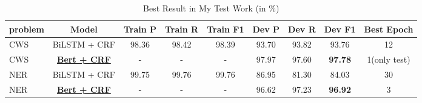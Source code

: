 \begin{table*}[htbp!]
    \centering
    \begin{tabular}{lcccccccc}
    \midrule
    problem & Model & Train P   &Train R     & Train F1       & Dev P      & Dev R & Dev F1 &Best Epoch\\
    \midrule
    CWS& BiLSTM + CRF & 98.36   & 98.42   & 98.39    & 93.70 & 93.82 &  93.76 & 12           \\
    CWS& \underline{\bf Bert + CRF}   & -       & -       & -        & 97.97 & 97.60 &  \bf97.78 & 1(only test) \\
    NER& BiLSTM + CRF & 99.75   & 99.76   & 99.76    & 86.95 & 81.30 & 84.03 & 30         \\
    NER& \underline{\bf Bert + CRF}   & -       & -       & -        & 96.62 & 97.23 & \bf96.92 & 3         \\     

    \bottomrule
    \end{tabular}
\caption{Best Result in My Test Work (in \%)}
\label{tab:batchSize}
\end{table*}
